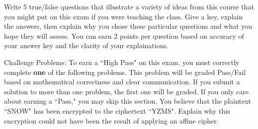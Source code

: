 \documentclass[11pt,addpoints,letterpaper]{exam}
\begin{document}
\begin{questions}
%    
\newpage

\question[10] Write 5 true/false questions that illustrate a variety of ideas from this course that you might put on this exam if you were teaching the class. Give a key, explain the answers, then explain why you chose these particular questions and what you hope they will assess. You can earn 2 points per question based on accuracy of your answer key and the clarity of your explainations.

\vfill
{}
\newpage 

{Challenge Problems:} To earn a ``High Pass" on this exam, you must correctly complete {\bf one} of the following problems. This problem will be graded Pass/Fail based on mathematical correctness and clear communication. If you submit a solution to more than one problem, the first one will be graded.  If you only care about earning a ``Pass," you may skip this section.
\question You believe that the plaintext ``SNOW" has been encrypted to the ciphertext ``YZMS".  Explain why this encryption could not have been the result of applying an affine cipher. 

 \question 
\end{questions}
\end{document}
